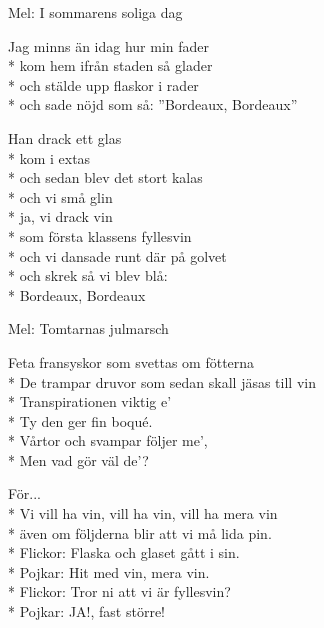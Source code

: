 \pagestyle{Vinvisor}
\begin{SongText}
    \begin{SongInfo}
        Mel: I sommarens soliga dag
    \end{SongInfo}
    \begin{SongVerse}
        Jag minns än idag hur min fader\\*%
        kom hem ifrån staden så glader\\*%
        och stälde upp flaskor i rader\\*%
        och sade nöjd som så: ”Bordeaux, Bordeaux”
    \end{SongVerse}
    \begin{SongVerse}
        Han drack ett glas\\*%
        kom i extas\\*%
        och sedan blev det stort kalas\\*%
        och vi små glin\\*%
        ja, vi drack vin\\*%
        som första klassens fyllesvin\\*%
        och vi dansade runt där på golvet\\*%
        och skrek så vi blev blå:\\*%
        Bordeaux, Bordeaux
    \end{SongVerse}
\end{SongText}
\begin{SongText}
    \begin{SongInfo}
        Mel: Tomtarnas julmarsch
    \end{SongInfo}
    \begin{SongVerse}
        Feta fransyskor som svettas om fötterna\\*%
        De trampar druvor som sedan skall jäsas till vin\\*%
        Transpirationen viktig e’\\*%
        Ty den ger fin boqué.\\*%
        Vårtor och svampar följer me’,\\*%
        Men vad gör väl de’?
    \end{SongVerse}
    \begin{SongVerse}
        För...\\*%
        Vi vill ha vin, vill ha vin, vill ha mera vin\\*%
        även om följderna blir att vi må lida pin.\\*%
        Flickor: Flaska och glaset gått i sin.\\*%
        Pojkar: Hit med vin, mera vin.\\*%
        Flickor: Tror ni att vi är fyllesvin?\\*%
        Pojkar: JA!, fast större!
    \end{SongVerse}
\end{SongText}
